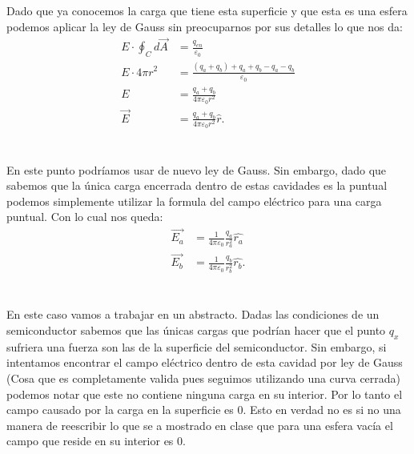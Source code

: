 \documentclass{report}
\begin{document}
Dado que ya conocemos la carga que tiene esta superficie y que esta es una esfera podemos aplicar la ley de Gauss sin preocuparnos por sus detalles lo que nos da:
\begin{align*}
  E \cdot \oint_{C} d\vec{A} &= \frac{q_{en}}{\varepsilon_0} \\ 
  E \cdot 4 \pi r^2 &= \frac{\left( q_a + q_b \right) + q_a + q_b - q_a - q_b}{\varepsilon_0} \\
  E &= \frac{q_a + q_b}{4\pi \varepsilon_0 r^2} \\
  \vec{E} &= \frac{q_a + q_b}{4\pi \varepsilon_0 r^2} \hat{r}
.\end{align*}

\section{}

En este punto podríamos usar de nuevo ley de Gauss. Sin embargo, dado que sabemos que la única carga encerrada dentro de estas cavidades es la puntual podemos simplemente utilizar la formula del campo eléctrico para una carga puntual. Con lo cual nos queda:
\begin{align*}
  \vec{E_a} &= \frac{1}{4\pi\varepsilon_0}\frac{q_a}{r_a^2}\hat{r_a} \\
  \vec{E_b} &= \frac{1}{4\pi\varepsilon_0}\frac{q_b}{r_b^2}\hat{r_b}
.\end{align*}

\section{}

En este caso vamos a trabajar en un abstracto. Dadas las condiciones de un semiconductor sabemos que las únicas cargas que podrían hacer que el punto $q_x$ sufriera una fuerza son las de la superficie del semiconductor. Sin embargo, si intentamos encontrar el campo eléctrico dentro de esta cavidad por ley de Gauss (Cosa que es completamente valida pues seguimos utilizando una curva cerrada) podemos notar que este no contiene ninguna carga en su interior. Por lo tanto el campo causado por la carga en la superficie es 0. Esto en verdad no es si no una manera de reescribir lo que se a mostrado en clase que para una esfera vacía el campo que reside en su interior es 0.

\section{}
\end{document}
